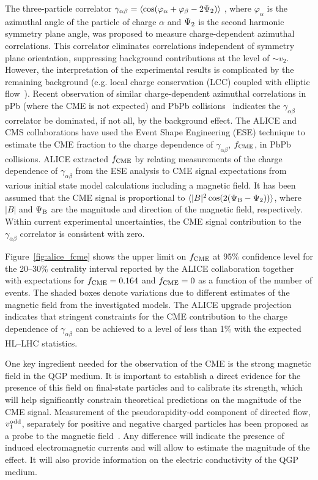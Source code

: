 The three-particle correlator $\gamma_{\alpha\beta} = \langle \cos(\varphi_{\alpha} + \varphi_{\beta} - 2\Psi_{\rm 2}) \rangle$ \cite{Voloshin:2004vk}, 
where $\varphi_{\alpha}$ is the azimuthal angle of the particle of charge $\alpha$ and $\Psi_{\rm 2}$ is the second harmonic symmetry plane 
angle, was proposed to measure charge-dependent azimuthal correlations. This correlator eliminates correlations independent of symmetry 
plane orientation, suppressing background contributions at the level of $\sim v_2$. However, the interpretation of the experimental results is 
complicated by the remaining background (e.g. local charge conservation (LCC) coupled with elliptic flow~\cite{Schlichting:2010qia, Pratt:2010zn}). 
Recent observation of similar charge-dependent azimuthal correlations in pPb (where the CME is not expected) and 
PbPb collisions~\cite{Khachatryan:2016got} indicates 
the $\gamma_{\alpha\beta}$ correlator be dominated, if not all, by the background effect.
The ALICE \cite{Acharya:2017fau} and CMS \cite{Sirunyan:2017quh} collaborations have used the Event Shape Engineering (ESE) technique 
\cite{Schukraft:2012ah} to estimate the CME fraction to the charge dependence of $\gamma_{\alpha\beta}$, $f_{\rm CME}$, in PbPb collisions. 
ALICE extracted 
$f_{\rm CME}$ by relating measurements of the charge dependence of $\gamma_{\alpha\beta}$ from the ESE analysis to CME signal expectations from 
various initial state model calculations including a magnetic field. It has been assumed that the CME signal is proportional to 
$\langle |B|^2 \cos(2(\Psi_{\rm B} - \Psi_2)) \rangle$, where $|B|$ and $\Psi_{\rm B}$ are the magnitude and direction of the magnetic field, respectively. Within current experimental uncertainties, the CME signal contribution to the $\gamma_{\alpha\beta}$ correlator is consistent with zero.

Figure~\ref{fig:alice_fcme} shows the upper limit on $f_{\rm CME}$ at 95\% confidence level for the 20--30\% centrality interval reported by the 
ALICE collaboration together with expectations for $f_{\rm CME}=0.164$ and $f_{\rm CME}=0$ as a function of the number of events. The shaded 
boxes denote variations due to different estimates of the magnetic field from the investigated models. The ALICE upgrade projection indicates that 
stringent constraints for the CME contribution to the charge dependence of $\gamma_{\alpha\beta}$ can be achieved to a level of less than 1\% 
with the expected HL--LHC statistics. 

One key ingredient needed for the observation of the CME is the strong magnetic field in the QGP medium. It is important to establish a direct
evidence for the presence of this field on final-state particles and to calibrate its strength, which will help significantly constrain theoretical predictions on the magnitude of the CME signal. Measurement of the pseudorapidity-odd component of directed 
flow, $v_1^{\rm odd}$, separately for positive and negative charged particles has been proposed as a probe to 
the magnetic field~\cite{Gursoy:2014aka}. Any difference will indicate the presence of induced electromagnetic 
currents and will allow to estimate the magnitude of the effect. It will also provide information on the electric conductivity of the QGP medium.


